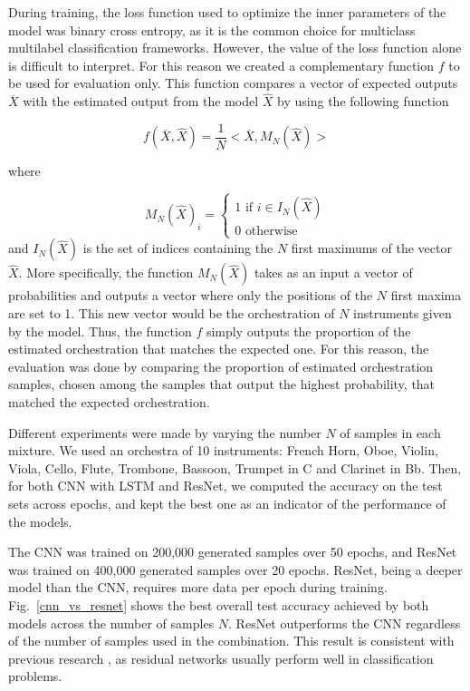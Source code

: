 \documentclass[runningheads,a4paper]{llncs}
\begin{document}
During training, the loss function used to optimize the inner parameters of the model was binary cross entropy, as it is the common choice for multiclass multilabel classification frameworks. However, the value of the loss function alone is difficult to interpret. For this reason we created a complementary function $f$ to be used for evaluation only. This function compares a vector of expected outputs $\overline{X}$ with the estimated output from the model $\hat{X}$ by using the following function

\begin{equation}
f(\overline{X}, \hat{X}) = \frac{1}{N}<\overline{X}, M_N(\hat{X})>
\label{eval}
\end{equation}

where

\begin{equation}
M_N(\hat{X})_i = \left\{\begin{array}{ll}
1 \text{ if } i \in I_N(\hat{X})\\
0 \text{ otherwise}
\end{array}\right.
\label{NMax}
\end{equation}
and $I_N(\hat{X})$ is the set of indices containing the $N$ first maximums of the vector $\hat{X}$. More specifically, the function $M_N(\hat{X})$ takes as an input a vector of probabilities and outputs a vector where only the positions of the $N$ first maxima are set to 1. This new vector would be the orchestration of $N$ instruments given by the model. Thus, the function $f$ simply outputs the proportion of the estimated orchestration that matches the expected one.
For this reason, the evaluation was done by comparing the proportion of estimated orchestration samples, chosen among the samples that output the highest probability, that matched the expected orchestration.

Different experiments were made by varying the number $N$ of samples in each mixture. We used an orchestra of 10 instruments: French Horn, Oboe, Violin, Viola, Cello, Flute, Trombone, Bassoon, Trumpet in C and Clarinet in Bb. Then, for both CNN with LSTM and ResNet, we computed the accuracy on the test sets across epochs, and kept the best one as an indicator of the performance of the models.

The CNN was trained on 200,000 generated samples over 50 epochs, and ResNet was trained on 400,000 generated samples over 20 epochs. ResNet, being a deeper model than the CNN, requires more data per epoch during training. Fig.~\ref{cnn_vs_resnet} shows the best overall test accuracy achieved by both models across the number of samples $N$.
ResNet outperforms the CNN regardless of the number of samples used in the combination. This result is consistent with previous research \cite{He15}, as residual networks usually perform well in classification problems.
\end{document}
